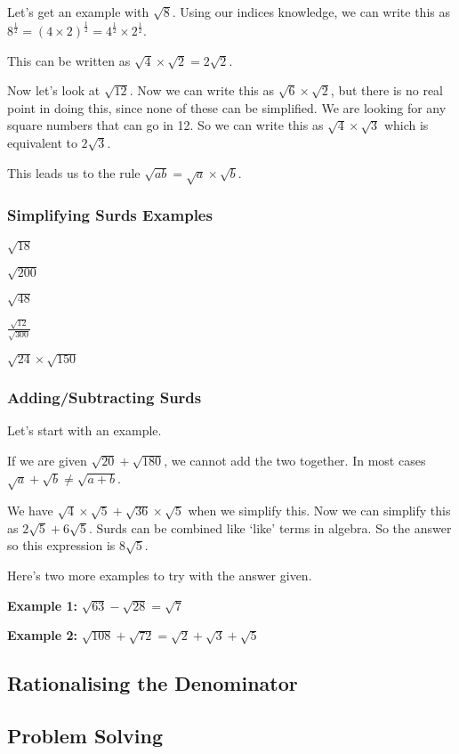 \documentclass[../maths.tex]{subfiles}
\begin{document}
Let's get an example with $\sqrt{8}$. Using our indices knowledge, we can write this as $8^{\frac{1}{2}}=(4\times 2)^{\frac{1}{2}}=4^{\frac{1}{2}}\times 2^{\frac{1}{2}}$.

This can be written as $\sqrt{4}\times \sqrt{2}=2\sqrt{2}$.

Now let's look at $\sqrt{12}$. Now we can write this as $\sqrt{6}\times \sqrt{2}$, but there is no real point in doing this, since none of these can be simplified.
We are looking for any square numbers that can go in 12. So we can write this as $\sqrt{4}\times \sqrt{3}$ which is equivalent to $2\sqrt{3}$.

This leads us to the rule $\sqrt{ab}=\sqrt{a}\times \sqrt{b}$.
\subsubsection*{Simplifying Surds Examples}
\ex $\sqrt{18}$

\ex $\sqrt{200}$

\ex $\sqrt{48}$

\ex $\frac{\sqrt{12}}{\sqrt{300}}$

\ex $\sqrt{24}\times \sqrt{150}$

\subsubsection*{Adding/Subtracting Surds}
Let's start with an example.

If we are given $\sqrt{20}+\sqrt{180}$, we cannot add the two together. In most cases $\sqrt{a}+\sqrt{b}\neq \sqrt{a+b}$.

We have $\sqrt{4}\times \sqrt{5} + \sqrt{36} \times \sqrt{5}$ when we simplify this. Now we can simplify this as $2\sqrt{5}+6\sqrt{5}$. 
Surds can be combined like `like' terms in algebra. So the answer so this expression is $8\sqrt{5}$.

Here's two more examples to try with the answer given.

\textbf{Example 1: } $\sqrt{63}-\sqrt{28}=\sqrt{7}$

\textbf{Example 2: } $\sqrt{108}+\sqrt{72} = \sqrt{2}+\sqrt{3}+\sqrt{5}$


\subsection*{Rationalising the Denominator}
\subsection*{Problem Solving}
\end{document}
